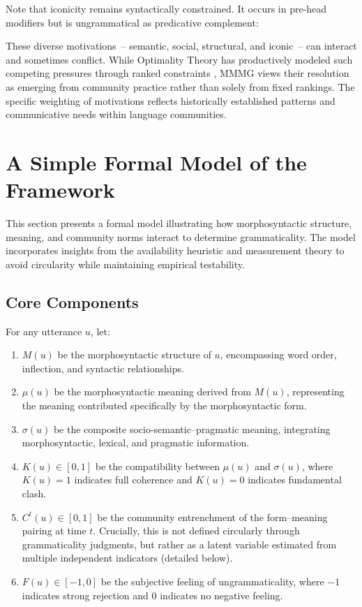 \documentclass[12pt,letterpaper]{article}
\begin{document}
Note that iconicity remains syntactically constrained. It occurs in pre-head modifiers but is ungrammatical as predicative complement:
\label{ex:big-big2-change}
\z

These diverse motivations~-- semantic, social, structural, and iconic~-- can interact and sometimes conflict. While Optimality Theory has productively modeled such competing pressures through ranked constraints \autocite{prince2004}, MMMG views their resolution as emerging from community practice rather than solely from fixed rankings. The specific weighting of motivations reflects historically established patterns and communicative needs within language communities.

\section{A Simple Formal Model of the Framework}\label{sec:formalism}

This section presents a formal model illustrating how morphosyntactic structure, meaning, and community norms interact to determine grammaticality. The model incorporates insights from the availability heuristic and measurement theory to avoid circularity while maintaining empirical testability.

\subsection{Core Components}

For any utterance $u$, let:

\begin{enumerate}
    \item $M(u)$ be the morphosyntactic structure of $u$, encompassing word order, inflection, and syntactic relationships.
    
    \item $\mu(u)$ be the morphosyntactic meaning derived from $M(u)$, representing the meaning contributed specifically by the morphosyntactic form.
    
    \item $\sigma(u)$ be the composite socio-semantic--pragmatic meaning, integrating morphosyntactic, lexical, and pragmatic information.
    
    \item $K(u) \in [0,1]$ be the compatibility between $\mu(u)$ and $\sigma(u)$, where $K(u) = 1$ indicates full coherence and $K(u) = 0$ indicates fundamental clash.
    
    \item $C^t(u) \in [0,1]$ be the community entrenchment of the form--meaning pairing at time $t$. Crucially, this is not defined circularly through grammaticality judgments, but rather as a latent variable estimated from multiple independent indicators (detailed below).
    
    \item $F(u) \in [-1,0]$ be the subjective feeling of ungrammaticality, where $-1$ indicates strong rejection and $0$ indicates no negative feeling.
\end{enumerate}
\end{document}

